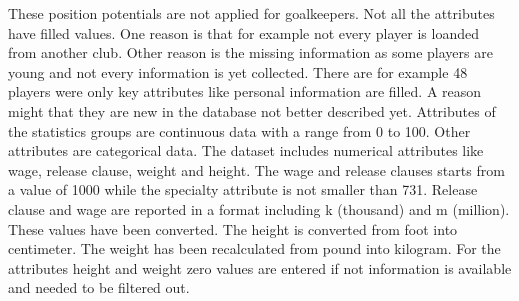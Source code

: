 These position potentials are not applied for goalkeepers.
Not all the attributes have filled values. One reason is that for example not every player is loanded from another club. Other reason is the missing information as some players are young and not every information is yet collected. There are for example 48 players were only key attributes like personal information are filled. A reason might that they are new in the database not better described yet. \newline
Attributes of the statistics groups are continuous data with a range from 0 to 100. Other attributes are categorical data. The dataset includes numerical attributes like wage, release clause, weight and height. \newline
The wage and release clauses starts from a value of 1000 while the specialty attribute is not smaller than 731. Release clause and wage are reported in a format including k (thousand) and m (million). These values have been converted. The height is converted from foot into centimeter. The weight has been recalculated from pound into kilogram.  For the attributes height and weight zero values are entered if not information is available and needed to be filtered out.
